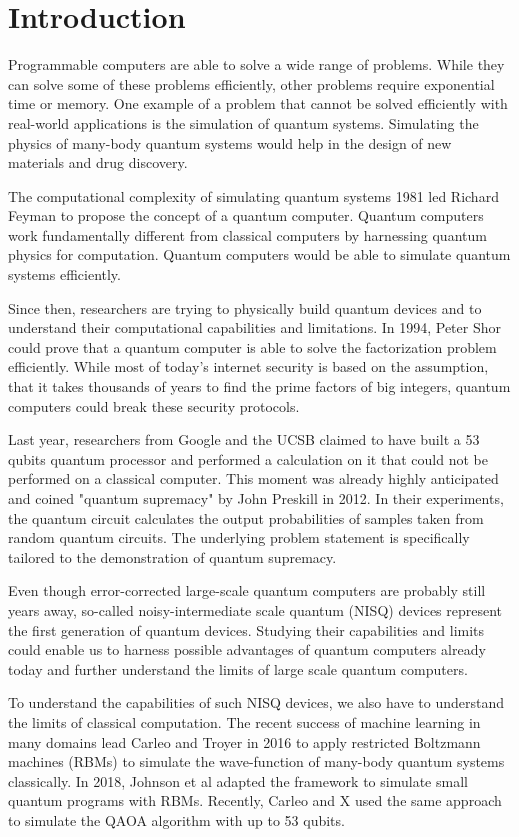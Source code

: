 \chapter{Introduction}

Programmable computers are able to solve a wide range of problems.
While they can solve some of these problems efficiently, 
other problems require exponential time or memory. One example of 
a problem that cannot be solved efficiently with real-world 
applications is the simulation of quantum systems. Simulating 
the physics of many-body quantum systems would help in the design 
of new materials and drug discovery.

The computational complexity of simulating quantum systems 1981 led 
Richard Feyman to propose the concept of a quantum computer. Quantum 
computers work fundamentally different from classical computers by 
harnessing quantum physics for computation. Quantum computers would be 
able to simulate quantum systems efficiently.

Since then, researchers are trying to physically build quantum devices
and to understand their computational capabilities and limitations. In 1994, 
Peter Shor could prove that a quantum computer is able to solve the 
factorization problem efficiently. While most of today's internet security 
is based on the assumption, that it takes thousands of years to find the 
prime factors of big integers, quantum computers could break these 
security protocols.

Last year, researchers from Google and the UCSB claimed to have built a 
53 qubits quantum processor and performed a calculation on it that could not be 
performed on a classical computer. This moment was already highly anticipated 
and coined "quantum supremacy" by John Preskill in 2012. In their experiments, 
the quantum circuit calculates the output probabilities of samples taken from 
random quantum circuits. The underlying problem statement is specifically tailored 
to the demonstration of quantum supremacy.

Even though error-corrected large-scale quantum computers are probably still 
years away, so-called noisy-intermediate scale 
quantum (NISQ) devices represent the first generation of quantum devices.
Studying their capabilities and limits could enable us to harness possible advantages 
of quantum computers already today and further understand the limits of 
large scale quantum computers.

To understand the capabilities of such NISQ devices, we also have to understand 
the limits of classical computation. The recent success of machine learning in 
many domains lead Carleo and Troyer in 2016 to apply restricted Boltzmann machines (RBMs)
to simulate the wave-function of many-body quantum systems classically. In 2018, 
Johnson et al adapted the framework to simulate small quantum programs with 
RBMs. Recently, Carleo and X used the same approach to simulate the QAOA algorithm 
with up to 53 qubits.

